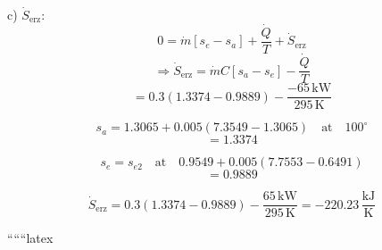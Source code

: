c) \(\dot{S}_{\text{erz}}\):
\[
0 = \dot{m} [s_e - s_a] + \frac{\dot{Q}}{T} + \dot{S}_{\text{erz}}
\]
\[
\Rightarrow \dot{S}_{\text{erz}} = \dot{m} C [s_a - s_e] - \frac{\dot{Q}}{T}
\]
\[
= 0.3 (1.3374 - 0.9889) - \frac{-65 \, \text{kW}}{295 \, \text{K}}
\]

\[
s_a = 1.3065 + 0.005 (7.3549 - 1.3065) \quad \text{at} \quad 100^\circ
\]
\[
= 1.3374
\]

\[
s_e = s_{e2} \quad \text{at} \quad 0.9549 + 0.005 (7.7553 - 0.6491)
\]
\[
= 0.9889
\]

\[
\dot{S}_{\text{erz}} = 0.3 (1.3374 - 0.9889) - \frac{65 \, \text{kW}}{295 \, \text{K}} = -220.23 \, \frac{\text{kJ}}{\text{K}}
\]

``````latex